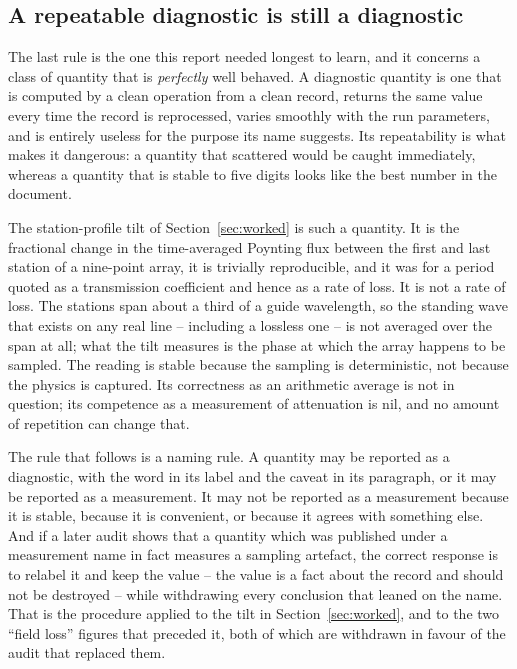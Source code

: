 \subsection{A repeatable diagnostic is still a diagnostic}
\label{sec:method-diagnostic}

The last rule is the one this report needed longest to learn, and it concerns a class of quantity that is
\emph{perfectly} well behaved. A diagnostic quantity is one that is computed by a clean operation from a clean
record, returns the same value every time the record is reprocessed, varies smoothly with the run parameters,
and is entirely useless for the purpose its name suggests. Its repeatability is what makes it dangerous: a
quantity that scattered would be caught immediately, whereas a quantity that is stable to five digits looks
like the best number in the document.

The station-profile tilt of Section~\ref{sec:worked} is such a quantity. It is the fractional change in the
time-averaged Poynting flux between the first and last station of a nine-point array, it is trivially
reproducible, and it was for a period quoted as a transmission coefficient and hence as a rate of loss. It is
not a rate of loss. The stations span about a third of a guide wavelength, so the standing wave that exists on any
real line -- including a lossless one -- is not averaged over the span at all; what the tilt measures is the
phase at which the array happens to be sampled. The reading is stable because the sampling is deterministic, not
because the physics is captured. Its correctness as an arithmetic average is not in question; its competence as
a measurement of attenuation is nil, and no amount of repetition can change that.

The rule that follows is a naming rule. A quantity may be reported as a diagnostic, with the word in its label
and the caveat in its paragraph, or it may be reported as a measurement. It may not be reported as a
measurement because it is stable, because it is convenient, or because it agrees with something else. And if a
later audit shows that a quantity which was published under a measurement name in fact measures a sampling
artefact, the correct response is to relabel it and keep the value -- the value is a fact about the record and
should not be destroyed -- while withdrawing every conclusion that leaned on the name. That is the procedure
applied to the tilt in Section~\ref{sec:worked}, and to the two ``field loss'' figures that preceded it, both of
which are withdrawn in favour of the audit that replaced them.

